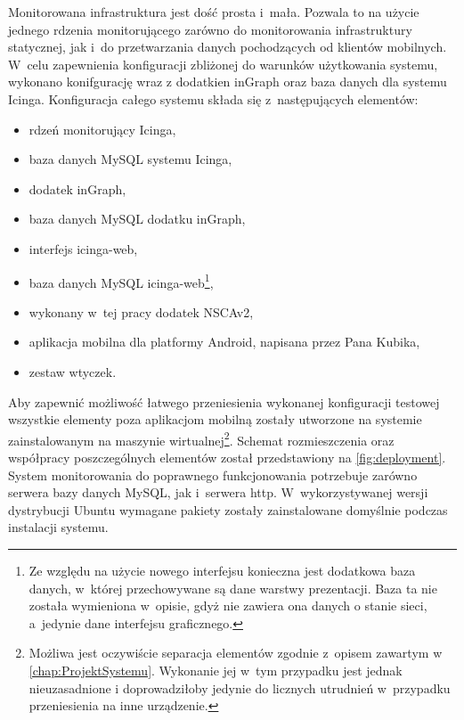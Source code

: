 Monitorowana infrastruktura jest dość prosta i~mała. Pozwala to na
użycie jednego rdzenia monitorującego zarówno do monitorowania
infrastruktury statycznej, jak i~do przetwarzania danych pochodzących
od klientów mobilnych. W~celu zapewnienia konfiguracji zbliżonej do
warunków użytkowania systemu, wykonano konifgurację wraz z dodatkien
inGraph oraz baza danych dla systemu Icinga. Konfiguracja całego
systemu składa się z~następujących elementów:

\begin{itemize}
\item rdzeń monitorujący Icinga,
\item baza danych MySQL systemu Icinga,
\item dodatek inGraph,
\item baza danych MySQL dodatku inGraph,
\item interfejs icinga-web,
\item baza danych MySQL icinga-web\footnote{Ze względu na użycie
    nowego interfejsu konieczna jest dodatkowa baza danych, w~której
    przechowywane są dane warstwy prezentacji. Baza ta nie została
    wymieniona w~opisie, gdyż nie zawiera ona danych o stanie sieci,
    a~jedynie dane interfejsu graficznego.},
\item wykonany w~tej pracy dodatek NSCAv2,
\item aplikacja mobilna dla platformy Android, napisana przez Pana
  Kubika,
\item zestaw wtyczek.
\end{itemize}

Aby zapewnić możliwość łatwego przeniesienia wykonanej konfiguracji
testowej wszystkie elementy poza aplikacjom mobilną zostały utworzone
na systemie zainstalowanym na maszynie wirtualnej\footnote{Możliwa
  jest oczywiście separacja elementów zgodnie z~opisem zawartym w~
  \ref{chap:ProjektSystemu}. Wykonanie jej w~tym przypadku jest jednak
  nieuzasadnione i doprowadziłoby jedynie do licznych utrudnień
  w~przypadku przeniesienia na inne urządzenie.}. Schemat
rozmieszczenia oraz współpracy poszczególnych elementów został
przedstawiony na \ref{fig:deployment}. System monitorowania do
poprawnego funkcjonowania potrzebuje zarówno serwera bazy danych
MySQL, jak i~serwera http. W~wykorzystywanej wersji dystrybucji Ubuntu
wymagane pakiety zostały zainstalowane domyślnie podczas instalacji
systemu.

